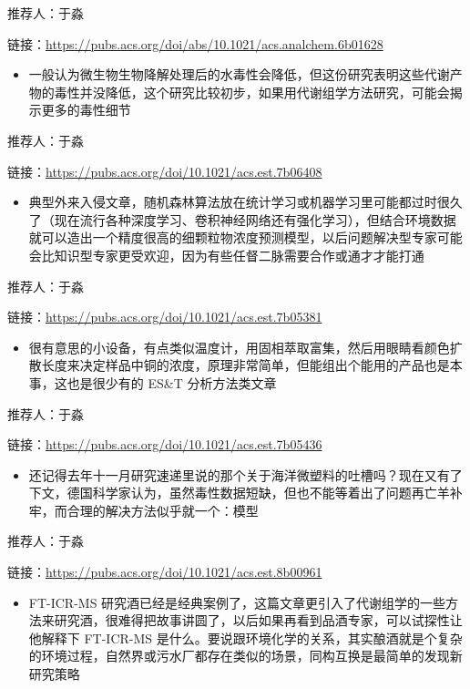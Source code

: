 \documentclass[]{book}
\providecommand{\tightlist}{%
  \setlength{\itemsep}{0pt}\setlength{\parskip}{0pt}}
\begin{document}
推荐人：于淼

链接：\url{https://pubs.acs.org/doi/abs/10.1021/acs.analchem.6b01628}

\begin{itemize}
\tightlist
\item
  一般认为微生物生物降解处理后的水毒性会降低，但这份研究表明这些代谢产物的毒性并没降低，这个研究比较初步，如果用代谢组学方法研究，可能会揭示更多的毒性细节
\end{itemize}

推荐人：于淼

链接：\url{https://pubs.acs.org/doi/10.1021/acs.est.7b06408}

\begin{itemize}
\tightlist
\item
  典型外来入侵文章，随机森林算法放在统计学习或机器学习里可能都过时很久了（现在流行各种深度学习、卷积神经网络还有强化学习），但结合环境数据就可以造出一个精度很高的细颗粒物浓度预测模型，以后问题解决型专家可能会比知识型专家更受欢迎，因为有些任督二脉需要合作或通才才能打通
\end{itemize}

推荐人：于淼

链接：\url{https://pubs.acs.org/doi/10.1021/acs.est.7b05381}

\begin{itemize}
\tightlist
\item
  很有意思的小设备，有点类似温度计，用固相萃取富集，然后用眼睛看颜色扩散长度来决定样品中铜的浓度，原理非常简单，但能组出个能用的产品也是本事，这也是很少有的 ES\&T 分析方法类文章
\end{itemize}

推荐人：于淼

链接：\url{https://pubs.acs.org/doi/10.1021/acs.est.7b05436}

\begin{itemize}
\tightlist
\item
  还记得去年十一月研究速递里说的那个关于海洋微塑料的吐槽吗？现在又有了下文，德国科学家认为，虽然毒性数据短缺，但也不能等着出了问题再亡羊补牢，而合理的解决方法似乎就一个：模型
\end{itemize}

推荐人：于淼

链接：\url{https://pubs.acs.org/doi/10.1021/acs.est.8b00961}

\begin{itemize}
\tightlist
\item
  FT-ICR-MS 研究酒已经是经典案例了，这篇文章更引入了代谢组学的一些方法来研究酒，很难得把故事讲圆了，以后如果再看到品酒专家，可以试探性让他解释下 FT-ICR-MS 是什么。要说跟环境化学的关系，其实酿酒就是个复杂的环境过程，自然界或污水厂都存在类似的场景，同构互换是最简单的发现新研究策略
\end{itemize}
\end{document}
